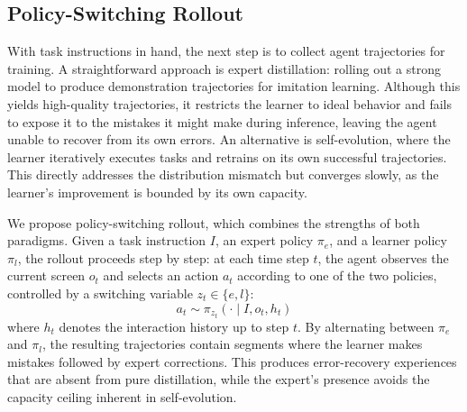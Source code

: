 \documentclass{article} %
\begin{document}


\vspace{-0.10cm}
\subsection{Policy-Switching Rollout}
\label{sec:traj_rollout}

With task instructions in hand, the next step is to collect agent trajectories for training. A straightforward approach is expert distillation: rolling out a strong model to produce demonstration trajectories for imitation learning.
Although this yields high-quality trajectories, it restricts the learner to ideal behavior and fails to expose it to the mistakes it might make during inference, leaving the agent unable to recover from its own errors.
An alternative is self-evolution, where the learner iteratively executes tasks and retrains on its own successful trajectories. 
This directly addresses the distribution mismatch but converges slowly, as the learner's improvement is bounded by its own capacity.

We propose policy-switching rollout, which combines the strengths of both paradigms.
Given a task instruction $I$, an expert policy $\pi_e$, and a learner policy $\pi_l$, the rollout proceeds step by step: at each time step $t$, the agent observes the current screen $o_t$ and selects an action $a_t$ according to one of the two policies, controlled by a switching variable $z_t \in \{e, l\}$:
\[
a_t \sim \pi_{z_t}(\cdot \mid I, o_t, h_t)
\]
where $h_t$ denotes the interaction history up to step $t$.
By alternating between $\pi_e$ and $\pi_l$, 
the resulting trajectories contain segments where the learner makes mistakes followed by expert corrections.
This produces error-recovery experiences that are absent from pure distillation, while the expert's presence avoids the capacity ceiling inherent in self-evolution.
\end{document}
